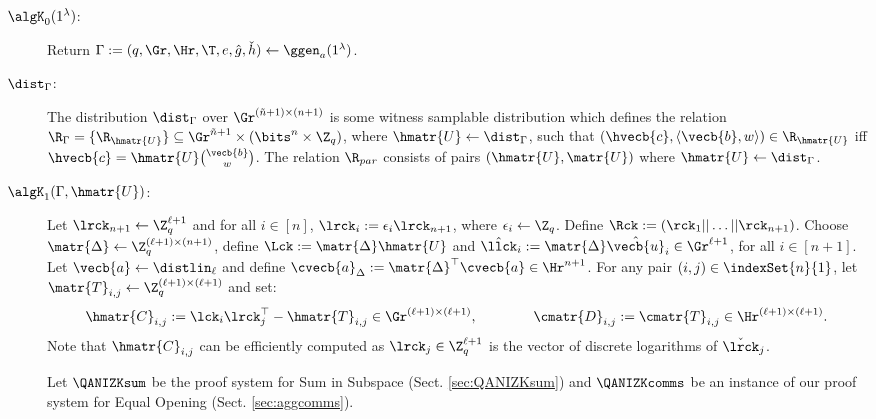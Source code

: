 \begin{description}

\item[$\algK_0(1^\lambda)$:]  Return $\Gamma := (q,\Gr,\Hr,\T,e,\hat{g},\check{h}) \leftarrow \ggen_a(1^{\lambda})$.

\item[$\dist_\Gamma$:]
The distribution $\dist_\Gamma$ over $\Gr^{(\tilde{n}+1) \times (n+1)}$ is some witness samplable distribution which 
defines the relation $\R_\Gamma = \{\R_{\hmatr{U}}\} 
\subseteq \Gr^{\tilde{n}+1}\times(\bits^n\times\Z_q)$,
where $\hmatr{U}\gets\dist_\Gamma$,
such that $(\hvecb{c},\langle\vecb{b}, w\rangle)\in\R_{\hmatr{U}}$ iff
$\hvecb{c}=\hmatr{U}\binom{\vecb{b}}{w}$. The relation $\R_{par}$ consists of pairs $(\hmatr{U},\matr{U})$ where $\hmatr{U} \gets \dist_{\Gamma}$.
\item[$\algK_1(\Gamma, \hmatr{U})$:]
Let $\lrck_{n+1}\gets \Z_q^{\ell+1}$
and for all $i \in [n]$, $\lrck_{i}:=\epsilon_{i}\lrck_{n+1}$, where
$\epsilon_{i} \leftarrow \Z_q$. Define
$\Rck := (\rck_1|| \ldots ||\rck_{n+1})$.
Choose 
$\matr{\Delta} \leftarrow \Z_q^{(\ell+1) \times (n+1)}$,
define $\Lck := \matr{\Delta}\hmatr{U}$
and $\hat{\llck}_{i}:=\matr{\Delta} \hat{\vecb{u}}_i \in \Gr^{\ell+1}$, for all $i \in [n+1]$. 
Let $\vecb{a} \leftarrow \distlin_{\ell}$ and define $\cvecb{a}_{\Delta}:=\matr{\Delta}^\top\cvecb{a} \in \Hr^{n+1}$. 
For any pair $(i,j) \in \indexSet{n}{1}$, let 
$\matr{T}_{i,j}\gets\Z_q^{(\ell+1)\times(\ell+1)}$ and set:
$$\hmatr{C}_{i,j}:=\lck_i \lrck_j^{\top} - \hmatr{T}_{i,j}  \in \Gr^{(\ell+1) \times (\ell+1)},
\qquad \qquad 
\cmatr{D}_{i,j}:=\cmatr{T}_{i,j} \in \Hr^{(\ell+1) \times (\ell+1)}.$$ 
Note that $\hmatr{C}_{i,j}$ can be efficiently computed 
as $\lrck_j \in \Z_q^{\ell+1}$ is the vector of discrete logarithms of $\check{\lrck}_j$.

Let $\QANIZKsum$ be the proof system for Sum in Subspace 
(Sect. \ref{sec:QANIZKsum}) and $\QANIZKcomms$
be an instance of our proof system for Equal Opening (Sect. \ref{sec:aggcomms}).


\end{description}
